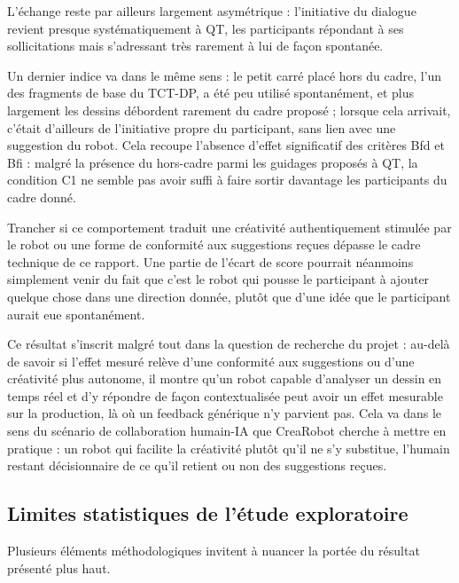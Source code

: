 \documentclass[11pt]{article}
\begin{document}
L'échange reste par ailleurs largement asymétrique : l'initiative du dialogue revient presque systématiquement à QT, les participants répondant à ses sollicitations mais s'adressant très rarement à lui de façon spontanée.

Un dernier indice va dans le même sens : le petit carré placé hors du cadre, l'un des fragments de base du TCT-DP, a été peu utilisé spontanément, et plus largement les dessins débordent rarement du cadre proposé ; lorsque cela arrivait, c'était d'ailleurs de l'initiative propre du participant, sans lien avec une suggestion du robot.
Cela recoupe l'absence d'effet significatif des critères Bfd et Bfi : malgré la présence du hors-cadre parmi les guidages proposés à QT, la condition C1 ne semble pas avoir suffi à faire sortir davantage les participants du cadre donné.

Trancher si ce comportement traduit une créativité authentiquement stimulée par le robot ou une forme de conformité aux suggestions reçues dépasse le cadre technique de ce rapport.
Une partie de l'écart de score pourrait néanmoins simplement venir du fait que c'est le robot qui pousse le participant à ajouter quelque chose dans une direction donnée, plutôt que d'une idée que le participant aurait eue spontanément.

Ce résultat s'inscrit malgré tout dans la question de recherche du projet : au-delà de savoir si l'effet mesuré relève d'une conformité aux suggestions ou d'une créativité plus autonome, il montre qu'un robot capable d'analyser un dessin en temps réel et d'y répondre de façon contextualisée peut avoir un effet mesurable sur la production, là où un feedback générique n'y parvient pas.
Cela va dans le sens du scénario de collaboration humain-IA que CreaRobot cherche à mettre en pratique : un robot qui facilite la créativité plutôt qu'il ne s'y substitue, l'humain restant décisionnaire de ce qu'il retient ou non des suggestions reçues.

\subsection{Limites statistiques de l'étude exploratoire}
\label{sec:limites}

Plusieurs éléments méthodologiques invitent à nuancer la portée du résultat présenté plus haut.
\end{document}
